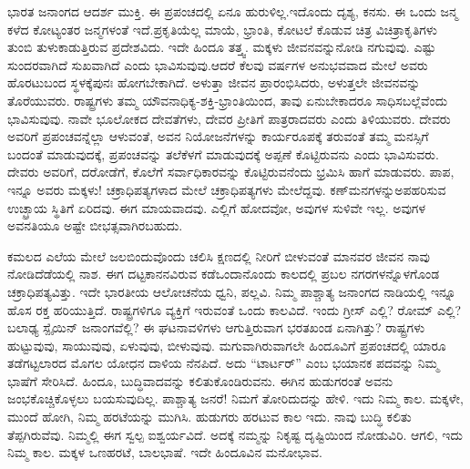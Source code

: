 ಭಾರತ ಜನಾಂಗದ ಆದರ್ಶ ಮುಕ್ತಿ. ಈ ಪ್ರಪಂಚದಲ್ಲಿ ಏನೂ ಹುರುಳಿಲ್ಲ.\break ಇದೊಂದು ದೃಶ್ಯ, ಕನಸು. ಈ ಒಂದು ಜನ್ಮ ಕಳೆದ ಕೋಟ್ಯಂತರ ಜನ್ಮಗಳಂತೆ ಇದೆ.\break ಪ್ರಕೃತಿಯೆಲ್ಲ ಮಾಯೆ, ಭ್ರಾಂತಿ, ಕೋಟಲೆ ಕೊಡುವ ಚಿತ್ರ ವಿಚಿತ್ರಾಕೃತಿಗಳು ತುಂಬಿ ತುಳುಕಾಡುತ್ತಿರುವ ಪ್ರದೇಶವಿದು. ಇದೇ ಹಿಂದೂ ತತ್ತ್ವ. ಮಕ್ಕಳು ಜೀವನವನ್ನು\break ನೋಡಿ ನಗುವುವು. ಎಷ್ಟು ಸುಂದರವಾಗಿದೆ ಸುಖವಾಗಿದೆ ಎಂದು ಭಾವಿಸುವುವು.\break ಆದರೆ ಕೆಲವು ವರ್ಷಗಳ ಅನುಭವವಾದ ಮೇಲೆ ಅವರು ಹೊರಟುಬಂದ ಸ್ಥಳಕ್ಕೆ\break ಪುನಃ ಹೋಗಬೇಕಾಗಿದೆ. ಅಳುತ್ತಾ ಜೀವನ ಪ್ರಾರಂಭಿಸಿದರು, ಅಳುತ್ತಲೇ ಜೀವನ\-ವನ್ನು ತೊರೆಯುವರು. ರಾಷ್ಟ್ರಗಳು ತಮ್ಮ ಯೌವನಾಧಿಕ್ಯ-ಶಕ್ತಿ-ಭ್ರಾಂತಿಯಿಂದ, ತಾವು ಏನುಬೇಕಾದರೂ ಸಾಧಿಸಬಲ್ಲೆವೆಂದು ಭಾವಿಸುವುವು. ನಾವೇ ಭೂಲೋಕದ ದೇವತೆಗಳು, ದೇವರ ಪ್ರೀತಿಗೆ ಪಾತ್ರರಾದವರು ಎಂದು ತಿಳಿಯುವರು. ದೇವರು ಅವರಿಗೆ ಪ್ರಪಂಚವನ್ನೆಲ್ಲಾ ಆಳುವಂತೆ, ಅವನ ನಿಯೋಜನೆಗಳನ್ನು ಕಾರ್ಯರೂಪಕ್ಕೆ ತರುವಂತೆ ತಮ್ಮ ಮನಸ್ಸಿಗೆ ಬಂದಂತೆ ಮಾಡುವುದಕ್ಕೆ, ಪ್ರಪಂಚವನ್ನು ತಲೆಕೆಳಗೆ ಮಾಡುವುದಕ್ಕೆ ಅಪ್ಪಣೆ ಕೊಟ್ಟಿರುವನು ಎಂದು ಭಾವಿಸುವರು. ದೇವರು ಅವರಿಗೆ, ದರೋಡೆಗೆ, ಕೊಲೆಗೆ ಸರ್ವಾಧಿಕಾರವನ್ನು ಕೊಟ್ಟಿರುವನೆಂದು ಭ್ರಮಿಸಿ ಹಾಗೆ ಮಾಡುವರು. ಪಾಪ, ಇನ್ನೂ ಅವರು ಮಕ್ಕಳು! ಚಕ್ರಾಧಿಪತ್ಯಗಳಾದ ಮೇಲೆ ಚಕ್ರಾಧಿಪತ್ಯಗಳು ಮೇಲೆದ್ದವು. ಕಣ್​ಮನಗಳನ್ನು\break ಅಪಹರಿಸುವ ಉಚ್ಛ್ರಾಯ ಸ್ಥಿತಿಗೆ ಏರಿದವು. ಈಗ ಮಾಯವಾದವು. ಎಲ್ಲಿಗೆ ಹೋದವೋ, ಅವುಗಳ ಸುಳಿವೇ ಇಲ್ಲ. ಅವುಗಳ ಅವನತಿಯೂ ಅಷ್ಟೇ ಬೀಭತ್ಸವಾಗಿರಬಹುದು.

ಕಮಲದ ಎಲೆಯ ಮೇಲೆ ಜಲಬಿಂದುವೊಂದು ಚಲಿಸಿ ಕ್ಷಣದಲ್ಲಿ ನೀರಿಗೆ ಬೀಳುವಂತೆ ಮಾನವರ ಜೀವನ ನಾವು ನೋಡಿದೆಡೆಯಲ್ಲಿ ನಾಶ. ಈಗ ದಟ್ಟಕಾನನವಿರುವ ಕಡೆ\break ಒಂದಾನೊಂದು ಕಾಲದಲ್ಲಿ ಪ್ರಬಲ ನಗರಗಳನ್ನೊಳಗೊಂಡ ಚಕ್ರಾಧಿಪತ್ಯವಿತ್ತು. ಇದೇ ಭಾರತೀಯ ಆಲೋಚನೆಯ ಧ್ವನಿ, ಪಲ್ಲವಿ. ನಿಮ್ಮ ಪಾಶ್ಚಾತ್ಯ ಜನಾಂಗದ ನಾಡಿಯಲ್ಲಿ ಇನ್ನೂ ಹೊಸ ರಕ್ತ ಹರಿಯುತ್ತಿದೆ. ರಾಷ್ಟ್ರಗಳಿಗೂ ವ್ಯಕ್ತಿಗೆ ಇರುವಂತೆ ಒಂದು ಕಾಲವಿದೆ. ಇಂದು ಗ್ರೀಸ್​ ಎಲ್ಲಿ? ರೋಮ್​ ಎಲ್ಲಿ? ಬಲಾಢ್ಯ ಸ್ಪೈಯಿನ್​ ಜನಾಂಗವೆಲ್ಲಿ? ಈ ಘಟನಾವಳಿಗಳು ಆಗುತ್ತಿರುವಾಗ ಭರತಖಂಡ ಏನಾಗಿತ್ತು? ರಾಷ್ಟ್ರಗಳು ಹುಟ್ಟುವುವು, ಸಾಯುವುವು, ಏಳುವುವು, ಬೀಳುವುವು. ಮಗುವಾಗಿರುವಾಗಲೇ ಹಿಂದೂವಿಗೆ ಪ್ರಪಂಚದಲ್ಲಿ ಯಾರೂ ತಡೆಗಟ್ಟಲಾರದ ಮೊಗಲ ಯೋಧನ ದಾಳಿಯ ನೆನಪಿದೆ. ಅದು “ಟಾರ್ಟರ್​” ಎಂಬ ಭಯಾನಕ ಪದವನ್ನು ನಿಮ್ಮ ಭಾಷೆಗೆ ಸೇರಿಸಿದೆ. ಹಿಂದೂ, ಬುದ್ಧಿವಾದವನ್ನು ಕಲಿತುಕೊಂಡಿರುವನು. ಈಗಿನ ಹುಡುಗರಂತೆ ಅವನು ಜಂಭಕೊಚ್ಚಿಕೊಳ್ಳಲು ಬಯಸುವುದಿಲ್ಲ. ಪಾಶ್ಚಾತ್ಯ ಜನರೆ! ನಿಮಗೆ ತೋರಿದುದನ್ನು ಹೇಳಿ. ಇದು ನಿಮ್ಮ ಕಾಲ. ಮಕ್ಕಳೇ, ಮುಂದೆ ಹೋಗಿ, ನಿಮ್ಮ ಹರಟೆಯನ್ನು ಮುಗಿಸಿ. ಹುಡುಗರು ಹರಟುವ ಕಾಲ ಇದು. ನಾವು ಬುದ್ಧಿ ಕಲಿತು ತೆಪ್ಪಗಿರುವೆವು. ನಿಮ್ಮಲ್ಲಿ ಈಗ ಸ್ವಲ್ಪ ಐಶ್ವರ್ಯವಿದೆ. ಅದಕ್ಕೆ ನಮ್ಮನ್ನು ನಿಕೃಷ್ಟ ದೃಷ್ಟಿಯಿಂದ ನೋಡುವಿರಿ. ಆಗಲಿ, ಇದು ನಿಮ್ಮ ಕಾಲ. ಮಕ್ಕಳ ಒಣಹರಟೆ, ಬಾಲಭಾಷೆ. ಇದೇ ಹಿಂದೂವಿನ ಮನೋಭಾವ.

